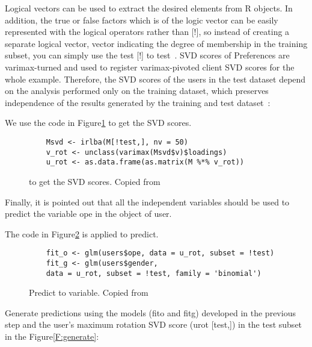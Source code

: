 Logical vectors can be used to extract the desired elements from R
 objects. In addition, the true or false factors
 which is of the logic vector can be easily represented with the 
logical operators rather than [!], 
so instead of creating a separate 
logical vector, vector indicating the degree of membership in the 
training subset, you can simply use the test [!] to 
test~\cite{hid515-12}. SVD scores of 
Preferences are varimax-turned and used to register varimax-pivoted
client SVD scores for the whole example.
Therefore, the SVD scores of the users in the test dataset depend
 on the analysis performed only on the training dataset, which 
preserves independence of the results generated by the 
training and test dataset~\cite{hid515-12}:

We use the code in Figure\ref{F:scores} to get the SVD scores.

\begin{figure}[htb]
\begin{footnotesize}
\begin{verbatim}
    Msvd <- irlba(M[!test,], nv = 50)
    v_rot <- unclass(varimax(Msvd$v)$loadings)
    u_rot <- as.data.frame(as.matrix(M %*% v_rot))
\end{verbatim}
\end{footnotesize}
\caption{to get the SVD scores. Copied from~\cite{hid515-12}}
\label{F:scores}
\end{figure}


Finally, it is pointed out that all the independent variables 
should be used to predict the variable ope in the object of user.

The code in Figure\ref{F:predict} is applied to predict.

\begin{figure}[htb]
\begin{footnotesize}
\begin{verbatim}
    fit_o <- glm(users$ope, data = u_rot, subset = !test)
    fit_g <- glm(users$gender, 
    data = u_rot, subset = !test, family = 'binomial')
\end{verbatim}
\end{footnotesize}
\caption{Predict to variable. Copied from~\cite{hid515-12}}
\label{F:predict}
\end{figure}


Generate predictions using the models (fito and fitg) developed in
 the previous step and the user's maximum rotation SVD score 
(urot [test,]) in the test subset in the Figure\ref{F:generate}:

